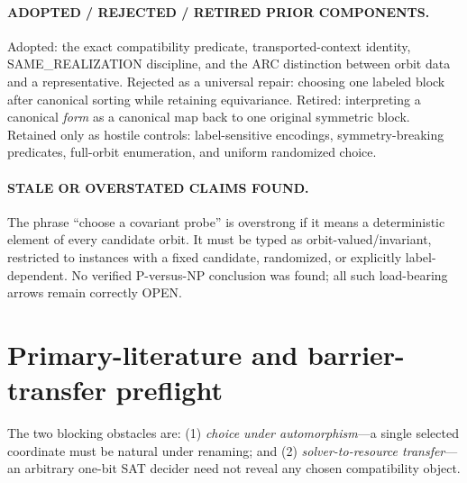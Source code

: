 \documentclass[11pt]{article}
\begin{document}
\paragraph{ADOPTED / REJECTED / RETIRED PRIOR COMPONENTS.}
Adopted: the exact compatibility predicate, transported-context identity, SAME\_REALIZATION discipline, and the ARC distinction between orbit data and a representative.  Rejected as a universal repair: choosing one labeled block after canonical sorting while retaining equivariance.  Retired: interpreting a canonical \emph{form} as a canonical map back to one original symmetric block.  Retained only as hostile controls: label-sensitive encodings, symmetry-breaking predicates, full-orbit enumeration, and uniform randomized choice.

\paragraph{STALE OR OVERSTATED CLAIMS FOUND.}
The phrase ``choose a covariant probe'' is overstrong if it means a deterministic element of every candidate orbit.  It must be typed as orbit-valued/invariant, restricted to instances with a fixed candidate, randomized, or explicitly label-dependent.  No verified P-versus-NP conclusion was found; all such load-bearing arrows remain correctly OPEN.

\section{Primary-literature and barrier-transfer preflight}

The two blocking obstacles are: (1) \emph{choice under automorphism}---a single selected coordinate must be natural under renaming; and (2) \emph{solver-to-resource transfer}---an arbitrary one-bit SAT decider need not reveal any chosen compatibility object.
\end{document}
